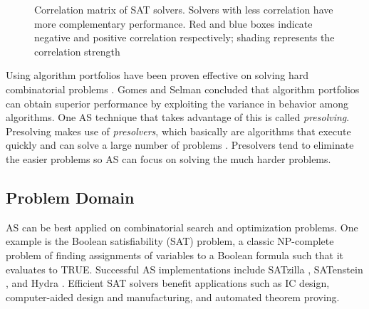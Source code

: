 \begin{figure}[H]      
	\caption[Correlation matrix of SAT solvers]{Correlation matrix of SAT solvers. Solvers with less correlation have more complementary performance. Red and blue boxes indicate negative and positive correlation respectively; shading represents the correlation strength \citep{bischl2016aslib}}
	\label{fig:satcorrel}
\end{figure}

Using algorithm portfolios have been proven effective on solving hard combinatorial problems \citep{gomes2001algorithm}. Gomes and Selman concluded that algorithm portfolios can obtain superior performance by exploiting the variance in behavior among algorithms. One AS technique that takes advantage of this is called \textit{presolving}. Presolving makes use of \textit{presolvers}, which basically are algorithms that execute quickly and can solve a large number of problems \citep{xu2008satzilla}. Presolvers tend to eliminate the easier problems so AS can focus on solving the much harder problems.

\subsection{Problem Domain}
AS can be best applied on combinatorial search and optimization problems. One example is the Boolean satisfiability (SAT) problem, a classic NP-complete problem of finding assignments of variables to a Boolean formula such that it evaluates to TRUE. Successful AS implementations include SATzilla \citep{xu2008satzilla}, SATenstein \citep{khudabukhsh2009satenstein}, and Hydra \citep{xu2010hydra}. Efficient SAT solvers benefit applications such as IC design, computer-aided design and manufacturing, and automated theorem proving.

